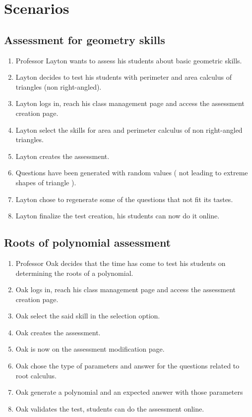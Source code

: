\documentclass{article}
\begin{document}
\section{Scenarios}

    \subsection{Assessment for geometry skills}
    
        \begin{enumerate}
        
            \item Professor Layton wants to assess his students about basic geometric 
            skills.
            \item Layton decides to test his students with perimeter and area 
            calculus of triangles (non right-angled).
            \item Layton logs in, reach his class management page and access the 
            assessment creation page.
            \item Layton select the skills for area and perimeter calculus of 
            non right-angled triangles.
            \item Layton creates the assessment.
            \item Questions have been generated with random values ( not leading 
            to extreme shapes of triangle ).
            \item Layton chose to regenerate some of the questions that not 
            fit its tastes.
            \item Layton finalize the test creation, his students can now do it online.
        \end{enumerate}
        
    \subsection{Roots of polynomial assessment}
    
        \begin{enumerate}
            \item Professor Oak decides that the time has come to test his students 
            on determining the roots of a polynomial.
            \item Oak logs in, reach his class management page and access the 
            assessment creation page.
            \item Oak select the said skill in the selection option.
            \item Oak creates the assessment.
            \item Oak is now on the assessment modification page.
            \item Oak chose the type of parameters and answer for the questions 
            related to root calculus.
            \item Oak generate a polynomial and an expected answer with those 
            parameters
            \item Oak validates the test, students can do the assessment online.
        \end{enumerate} 
\end{document}
